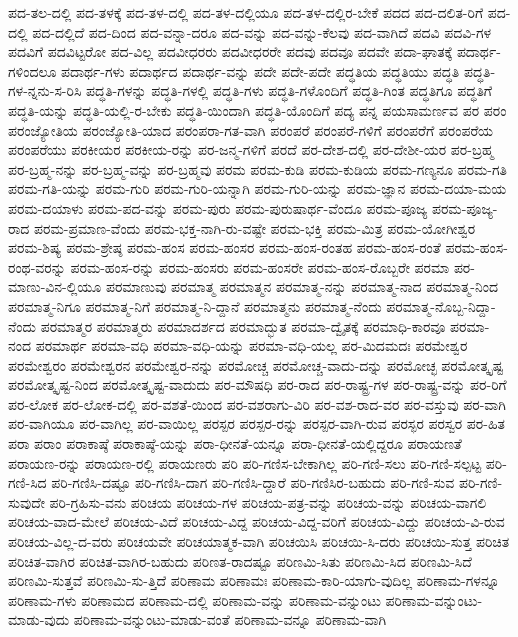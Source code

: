 {ಪದ-ತಲ-ದಲ್ಲಿ
ಪದ-ತಳಕ್ಕೆ
ಪದ-ತಳ-ದಲ್ಲಿ
ಪದ-ತಳ-ದಲ್ಲಿಯೂ
ಪದ-ತಳ-ದಲ್ಲಿರ-ಬೇಕೆ
ಪದದ
ಪದ-ದಲಿತ-ರಿಗೆ
ಪದ-ದಲ್ಲಿ
ಪದ-ದಲ್ಲಿದೆ
ಪದ-ದಿಂದ
ಪದ-ವನ್ನಾ-ದರೂ
ಪದ-ವನ್ನು
ಪದ-ವನ್ನು-ಕೆಲವು
ಪದ-ವಾಗಿದೆ
ಪದವಿ
ಪದವಿ-ಗಳ
ಪದವಿಗೆ
ಪದವಿಟ್ಟರೋ
ಪದ-ವಿಲ್ಲ
ಪದವೀಧರರು
ಪದವೀಧರರೇ
ಪದವು
ಪದವೂ
ಪದವೇ
ಪದಾ-ಘಾತಕ್ಕೆ
ಪದಾರ್ಥ-ಗಳಿಂದಲೂ
ಪದಾರ್ಥ-ಗಳು
ಪದಾರ್ಥದ
ಪದಾರ್ಥ-ವನ್ನು
ಪದೇ
ಪದೇ-ಪದೇ
ಪದ್ಧತಿಯ
ಪದ್ಧತಿಯು
ಪದ್ಧತಿ
ಪದ್ಧತಿ-ಗಳ-ನ್ನನು-ಸ-ರಿಸಿ
ಪದ್ಧತಿ-ಗಳನ್ನು
ಪದ್ಧತಿ-ಗಳಲ್ಲಿ
ಪದ್ಧತಿ-ಗಳು
ಪದ್ಧತಿ-ಗಳೊಂದಿಗೆ
ಪದ್ಧತಿ-ಗಿಂತ
ಪದ್ಧತಿಗೂ
ಪದ್ಧತಿಗೆ
ಪದ್ಧತಿ-ಯನ್ನು
ಪದ್ಧತಿ-ಯಲ್ಲಿ-ರ-ಬೇಕು
ಪದ್ಧತಿ-ಯಿಂದಾಗಿ
ಪದ್ಧತಿ-ಯೊಂದಿಗೆ
ಪದ್ಯ
ಪನ್ನ
ಪಯಸಾಮರ್ಣವ
ಪರ
ಪರಂ
ಪರಂಜ್ಯೋತಿಯ
ಪರಂಜ್ಯೋತಿ-ಯಾದ
ಪರಂಪರಾ-ಗತ-ವಾಗಿ
ಪರಂಪರೆ
ಪರಂಪರೆ-ಗಳಿಗೆ
ಪರಂಪರೆಗೆ
ಪರಂಪರೆಯ
ಪರಂಪರೆಯು
ಪರಕೀಯರ
ಪರಕೀಯ-ರನ್ನು
ಪರ-ಜನ್ಮ-ಗಳಿಗೆ
ಪರದೆ
ಪರ-ದೇಶ-ದಲ್ಲಿ
ಪರ-ದೇಶೀ-ಯರ
ಪರ-ಬ್ರಹ್ಮ
ಪರ-ಬ್ರಹ್ಮ-ನನ್ನು
ಪರ-ಬ್ರಹ್ಮ-ವನ್ನು
ಪರ-ಬ್ರಹ್ಮವು
ಪರಮ
ಪರಮ-ಕುಡಿ
ಪರಮ-ಕುಡಿಯ
ಪರಮ-ಗಣ್ಯನೂ
ಪರಮ-ಗತಿ
ಪರಮ-ಗತಿ-ಯನ್ನು
ಪರಮ-ಗುರಿ
ಪರಮ-ಗುರಿ-ಯನ್ನಾಗಿ
ಪರಮ-ಗುರಿ-ಯನ್ನು
ಪರಮ-ಜ್ಞಾನ
ಪರಮ-ದಯಾ-ಮಯ
ಪರಮ-ದಯಾಳು
ಪರಮ-ಪದ-ವನ್ನು
ಪರಮ-ಪುರು
ಪರಮ-ಪುರುಷಾರ್ಥ-ವೆಂದೂ
ಪರಮ-ಪೂಜ್ಯ
ಪರಮ-ಪೂಜ್ಯ-ರಾದ
ಪರಮ-ಪ್ರಮಾಣ-ವೆಂದು
ಪರಮ-ಭಕ್ತ-ನಾಗಿ-ರು-ವಷ್ಟೇ
ಪರಮ-ಭಕ್ತಿ
ಪರಮ-ಮಿತ್ರ
ಪರಮ-ಯೋಗೀಶ್ವರ
ಪರಮ-ಶಿಷ್ಯ
ಪರಮ-ಶ್ರೇಷ್ಠ
ಪರಮ-ಹಂಸ
ಪರಮ-ಹಂಸರ
ಪರಮ-ಹಂಸ-ರಂತಹ
ಪರಮ-ಹಂಸ-ರಂತೆ
ಪರಮ-ಹಂಸ-ರಂಥ-ವರನ್ನು
ಪರಮ-ಹಂಸ-ರನ್ನು
ಪರಮ-ಹಂಸರು
ಪರಮ-ಹಂಸರೇ
ಪರಮ-ಹಂಸ-ರೊಬ್ಬರೇ
ಪರಮಾ
ಪರ-ಮಾಣು-ವಿನ-ಲ್ಲಿಯೂ
ಪರಮಾಣುವು
ಪರಮಾತ್ಮ
ಪರಮಾತ್ಮನ
ಪರಮಾತ್ಮ-ನನ್ನು
ಪರಮಾತ್ಮ-ನಾದ
ಪರಮಾತ್ಮ-ನಿಂದ
ಪರಮಾತ್ಮ-ನಿಗೂ
ಪರಮಾತ್ಮ-ನಿಗೆ
ಪರಮಾತ್ಮ-ನಿ-ದ್ದಾನೆ
ಪರಮಾತ್ಮನು
ಪರಮಾತ್ಮ-ನೆಂದು
ಪರಮಾತ್ಮ-ನೊಬ್ಬ-ನಿದ್ದಾ-ನೆಂದು
ಪರಮಾತ್ಮರ
ಪರಮಾತ್ಮರು
ಪರಮಾದರ್ಶದ
ಪರಮಾದ್ಭುತ
ಪರಮಾ-ದ್ವೈತಕ್ಕೆ
ಪರಮಾಧಿ-ಕಾರವೂ
ಪರಮಾ-ನಂದ
ಪರಮಾರ್ಥ
ಪರಮಾ-ವಧಿ
ಪರಮಾ-ವಧಿ-ಯನ್ನು
ಪರಮಾ-ವಧಿ-ಯಲ್ಲ
ಪರ-ಮಿದಮದಃ
ಪರಮೇಶ್ವರ
ಪರಮೇಶ್ವರಂ
ಪರಮೇಶ್ವರನ
ಪರಮೇಶ್ವರ-ನನ್ನು
ಪರಮೋಚ್ಚ
ಪರಮೋಚ್ಚ-ವಾದು-ದನ್ನು
ಪರಮೋಚ್ಛ
ಪರಮೋತ್ಕೃಷ್ಟ
ಪರಮೋತ್ಕೃಷ್ಟ-ನಿಂದ
ಪರಮೋತ್ಕೃಷ್ಟ-ವಾದುದು
ಪರ-ಮೌಷಧಿ
ಪರ-ರಾದ
ಪರ-ರಾಷ್ಟ್ರ-ಗಳ
ಪರ-ರಾಷ್ಟ್ರ-ವನ್ನು
ಪರ-ರಿಗೆ
ಪರ-ಲೋಕ
ಪರ-ಲೋಕ-ದಲ್ಲಿ
ಪರ-ವಶತೆ-ಯಿಂದ
ಪರ-ವಶರಾಗು-ವಿರಿ
ಪರ-ವಶ-ರಾದ-ವರ
ಪರ-ವಸ್ತುವು
ಪರ-ವಾಗಿ
ಪರ-ವಾಗಿಯೂ
ಪರ-ವಾಗಿಲ್ಲ
ಪರ-ವಾಯಿಲ್ಲ
ಪರಸ್ಪರ
ಪರಸ್ಪರ-ರನ್ನು
ಪರಸ್ಪರ-ವಾಗಿ-ರುವ
ಪರಸ್ಫರ
ಪರಸ್ವರ
ಪರ-ಹಿತ
ಪರಾ
ಪರಾಂ
ಪರಾಕಾಷ್ಠೆ
ಪರಾಕಾಷ್ಠೆ-ಯನ್ನು
ಪರಾ-ಧೀನತೆ-ಯನ್ನೂ
ಪರಾ-ಧೀನತೆ-ಯಲ್ಲಿದ್ದರೂ
ಪರಾಯಣತೆ
ಪರಾಯಣ-ರನ್ನು
ಪರಾಯಣ-ರಲ್ಲಿ
ಪರಾಯಣರು
ಪರಿ
ಪರಿ-ಗಣಿಸ-ಬೇಕಾಗಿಲ್ಲ
ಪರಿ-ಗಣಿ-ಸಲು
ಪರಿ-ಗಣಿ-ಸಲ್ಪಟ್ಟ
ಪರಿ-ಗಣಿ-ಸಿದ
ಪರಿ-ಗಣಿಸಿ-ದಷ್ಟೂ
ಪರಿ-ಗಣಿಸಿ-ದಾಗ
ಪರಿ-ಗಣಿಸಿ-ದ್ದಾರೆ
ಪರಿ-ಗಣಿಸಿರ-ಬಹುದು
ಪರಿ-ಗಣಿ-ಸುವ
ಪರಿ-ಗಣಿ-ಸುವುದೇ
ಪರಿ-ಗ್ರಹಿಸು-ವನು
ಪರಿಚಯ
ಪರಿಚಯ-ಗಳ
ಪರಿಚಯ-ಪತ್ರ-ವನ್ನು
ಪರಿಚಯ-ವನ್ನು
ಪರಿಚಯ-ವಾಗಲಿ
ಪರಿಚಯ-ವಾದ-ಮೇಲೆ
ಪರಿಚಯ-ವಿದೆ
ಪರಿಚಯ-ವಿದ್ದ
ಪರಿಚಯ-ವಿದ್ದ-ವರಿಗೆ
ಪರಿಚಯ-ವಿದ್ದು
ಪರಿಚಯ-ವಿ-ರುವ
ಪರಿಚಯ-ವಿಲ್ಲ-ದ-ವರು
ಪರಿಚಯವೇ
ಪರಿಚಯಾತ್ಮಕ-ವಾಗಿ
ಪರಿಚಯಿಸಿ
ಪರಿಚಯಿ-ಸಿ-ದರು
ಪರಿಚಯಿ-ಸುತ್ತ
ಪರಿಚಿತ
ಪರಿಚಿತ-ವಾಗಿರ
ಪರಿಚಿತ-ವಾಗಿರ-ಬಹುದು
ಪರಿಣತ-ರಾದಷ್ಟೂ
ಪರಿಣಮಿ-ಸಿತು
ಪರಿಣಮಿ-ಸಿದ
ಪರಿಣಮಿ-ಸಿದೆ
ಪರಿಣಮಿ-ಸುತ್ತವೆ
ಪರಿಣಮಿ-ಸು-ತ್ತಿದೆ
ಪರಿಣಾಮ
ಪರಿಣಾಮಃ
ಪರಿಣಾಮ-ಕಾರಿ-ಯಾಗು-ವುದಿಲ್ಲ
ಪರಿಣಾಮ-ಗಳನ್ನೂ
ಪರಿಣಾಮ-ಗಳು
ಪರಿಣಾಮದ
ಪರಿಣಾಮ-ದಲ್ಲಿ
ಪರಿಣಾಮ-ವನ್ನು
ಪರಿಣಾಮ-ವನ್ನುಂಟು
ಪರಿಣಾಮ-ವನ್ನುಂಟು-ಮಾಡು-ವುದು
ಪರಿಣಾಮ-ವನ್ನುಂಟು-ಮಾಡು-ವಂತೆ
ಪರಿಣಾಮ-ವನ್ನೂ
ಪರಿಣಾಮ-ವಾಗಿ
}
